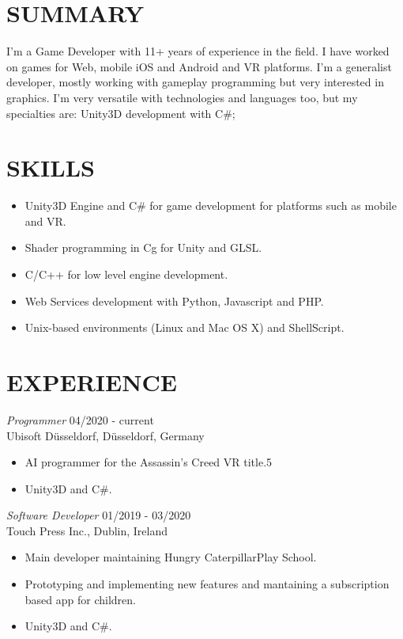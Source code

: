 \documentclass[line,margin]{res}
\begin{document}

\address{Rethelstraße 11, Düsseldorf - Germany}
\address{+49 1522 452 6742 - bruno@croci.me - \href{https://bruno.croci.me/}{https://bruno.croci.me/}}

 
\begin{resume}
 
\section{SUMMARY} I'm a Game Developer with 11+ years of experience in the field. I have worked on games for Web, mobile iOS and Android and VR platforms. I'm a generalist developer, mostly working with gameplay programming but very interested in graphics. I'm very versatile with technologies and languages too, but my specialties are: Unity3D development with C\#;
 
\section{SKILLS}
        \begin{itemize}  \itemsep 1.25pt
                \item Unity3D Engine and C\# for game development for platforms such as mobile and VR.
                \item Shader programming in Cg for Unity and GLSL.
                \item C/C++ for low level engine development.
                \item Web Services development with Python, Javascript and PHP.
                \item Unix-based environments (Linux and Mac OS X) and ShellScript.
        \end{itemize}
 
\section{EXPERIENCE} 
        {\sl Programmer} \hfill 04/2020 - current \\
                Ubisoft Düsseldorf, Düsseldorf, Germany
        \begin{itemize}  \itemsep 1.25pt
                \item AI programmer for the Assassin's Creed VR title.5
                \item Unity3D and C\#.
        \end{itemize}

        {\sl Software Developer} \hfill 01/2019 - 03/2020 \\
		Touch Press Inc., Dublin, Ireland
        \begin{itemize}  \itemsep 1.25pt
                \item Main developer maintaining Hungry Caterpillar\texttrademark  Play School.
                \item Prototyping and implementing new features and mantaining a subscription based app for children.
                \item Unity3D and C\#.
        \end{itemize}


\end{resume}
\end{document}
